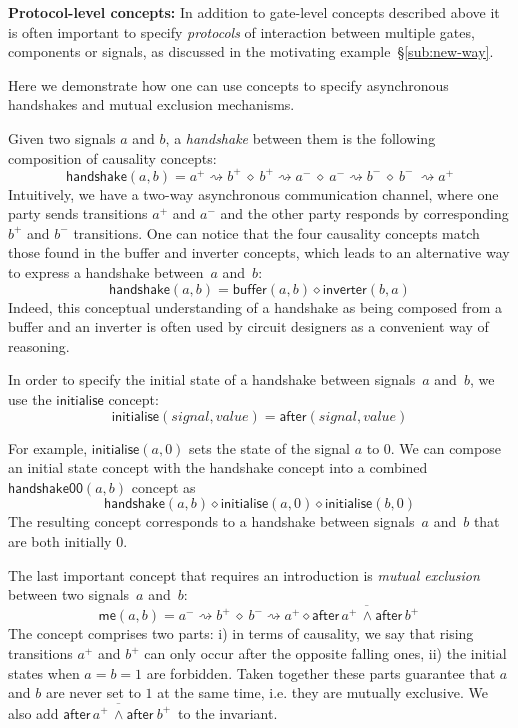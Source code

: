 \documentclass[british,compsoc]{IEEEtran}
\begin{document}
\textbf{Protocol-level concepts:} In addition to gate-level concepts
described above it is often important to specify \emph{protocols}
of interaction between multiple gates, components or signals, as
discussed in the motivating example~\S\ref{sub:new-way}.

Here we demonstrate how one can use concepts to specify asynchronous handshakes
and mutual exclusion mechanisms.

Given two signals $a$ and $b$, a \emph{handshake} between them is
the following composition of causality concepts:
\[
\mathsf{handshake}(a, b)=a^{+}\!\rightsquigarrow\! b^{+}\ \diamond\ b^{+}\!\rightsquigarrow\! a^{-}\ \diamond\ a^{-}\!\rightsquigarrow\! b^{-}\ \diamond\ b^{-}\ \rightsquigarrow\! a^{+}
\]
Intuitively, we have a two-way asynchronous communication channel,
where one party sends transitions $a^{+}$ and $a^{-}$ and the other
party responds by corresponding $b^{+}$ and $b^{-}$ transitions.
One can notice that the four causality concepts match those found
in the buffer and inverter concepts, which leads to an alternative
way to express a handshake between~$a$ and~$b$:
\[
\mathsf{handshake}(a, b)=\mathsf{buffer}(a, b) \diamond\mathsf{inverter}(b, a)
\]
Indeed, this conceptual understanding of a handshake as being composed
from a buffer and an inverter is often used by circuit designers as
a convenient way of reasoning.

In order to specify the initial state of a handshake between signals~$a$
and~$b$, we use the $\mathsf{initialise}$ concept:
\[
\mathsf{initialise}(\mathit{signal},\mathit{value})=\mathsf{after}(signal, value)
\]

\noindent For example, $\mathsf{initialise}(a, 0)$ sets the state of the signal
$a$ to $0$. We can compose an initial state concept with the handshake concept
into a combined $\mathsf{handshake00}(a, b)$ concept as
\[
\mathsf{handshake}(a, b) \diamond \mathsf{initialise}(a, 0) \diamond \mathsf{initialise}(b, 0)
\]
The resulting concept corresponds to a handshake between signals~$a$
and~$b$ that are both initially $0$.

The last important concept that requires an introduction is \emph{mutual
exclusion} between two signals~$a$ and~$b$:
\[
\mathsf{me}(a, b) = a^{-}\rightsquigarrow b^{+}\ \diamond\ b^{-}\rightsquigarrow a^{+}\diamond\overline{\mathsf{after}\,a^{+} \, \wedge\mathsf{after}\,b^{+}\, }
\]
The concept comprises two parts: i) in terms of causality, we say
that rising transitions $a^{+}$ and $b^{+}$ can only occur after
the opposite falling ones, ii) the initial states when $a=b=1$ are
forbidden. Taken together these parts guarantee that $a$ and
$b$ are never set to $1$ at the same time, i.e. they are mutually
exclusive. We also add $\overline{\mathsf{after}\, a^{+} \, \wedge\mathsf{after}\ b^{+}\,}$
to the invariant.
\end{document}
